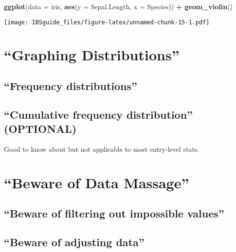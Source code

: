 \documentclass[]{book}
\newenvironment{Shaded}{\begin{snugshade}}{\end{snugshade}}
\newcommand{\KeywordTok}[1]{\textcolor[rgb]{0.13,0.29,0.53}{\textbf{#1}}}
\newcommand{\DataTypeTok}[1]{\textcolor[rgb]{0.13,0.29,0.53}{#1}}
\newcommand{\StringTok}[1]{\textcolor[rgb]{0.31,0.60,0.02}{#1}}
\newcommand{\OperatorTok}[1]{\textcolor[rgb]{0.81,0.36,0.00}{\textbf{#1}}}
\newcommand{\NormalTok}[1]{#1}
\theoremstyle{definition}
\theoremstyle{definition}
\theoremstyle{definition}
\theoremstyle{remark}
\begin{document}
\begin{Shaded}
\begin{Highlighting}[]
\KeywordTok{ggplot}\NormalTok{(}\DataTypeTok{data =}\NormalTok{ iris,}
       \KeywordTok{aes}\NormalTok{(}\DataTypeTok{y =}\NormalTok{ Sepal.Length,}
           \DataTypeTok{x =}\NormalTok{ Species)) }\OperatorTok{+}
\StringTok{  }\KeywordTok{geom_violin}\NormalTok{()}
\end{Highlighting}
\end{Shaded}

\texttt{[image: IBSguide\_files/figure-latex/unnamed-chunk-15-1.pdf]}

\section{\texorpdfstring{``Graphing
Distributions''}{Graphing Distributions}}\label{graphing-distributions}

\subsection{\texorpdfstring{``Frequency
distributions''}{Frequency distributions}}\label{frequency-distributions}

\subsection{\texorpdfstring{``Cumulative frequency distribution''
(OPTIONAL)}{Cumulative frequency distribution (OPTIONAL)}}\label{cumulative-frequency-distribution-optional}

Good to know about but not applicable to most entry-level stats.

\section{\texorpdfstring{``Beware of Data
Massage''}{Beware of Data Massage}}\label{beware-of-data-massage}

\subsection{\texorpdfstring{``Beware of filtering out impossible
values''}{Beware of filtering out impossible values}}\label{beware-of-filtering-out-impossible-values}

\subsection{\texorpdfstring{``Beware of adjusting
data''}{Beware of adjusting data}}\label{beware-of-adjusting-data}
\end{document}
